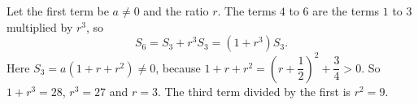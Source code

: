 Let the first term be $a\ne0$ and the ratio $r$. The terms $4$ to $6$ are the terms $1$ to $3$ multiplied by $r^3$, so
\[S_6=S_3+r^3S_3=\left(1+r^3\right)S_3.\]
Here $S_3=a\left(1+r+r^2\right)\ne0$, because $1+r+r^2=\left(r+\dfrac12\right)^2+\dfrac34>0$. So $1+r^3=28$, $r^3=27$ and $r=3$. The third term divided by the first is $r^2=\boxed{9}$.
